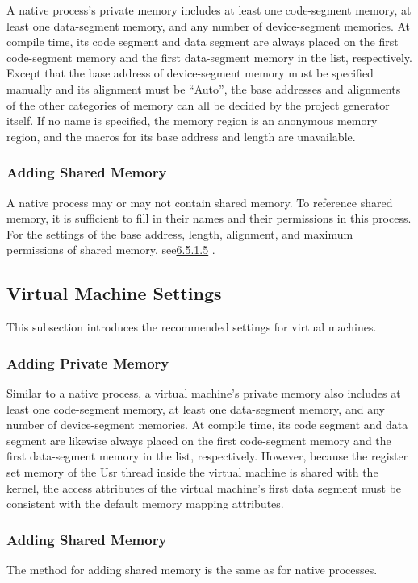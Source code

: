 A native process's private memory includes at least one code-segment memory, at least one data-segment memory, and any number of device-segment memories. At compile time, its code segment and data segment are always placed on the first code-segment memory and the first data-segment memory in the list, respectively. Except that the base address of device-segment memory must be specified manually and its alignment must be ``Auto'', the base addresses and alignments of the other categories of memory can all be decided by the project generator itself. If no name is specified, the memory region is an anonymous memory region, and the macros for its base address and length are unavailable.

\subsubsection{Adding Shared Memory}\label{subsubsec:6-5-4-2}

A native process may or may not contain shared memory. To reference shared memory, it is sufficient to fill in their names and their permissions in this process. For the settings of the base address, length, alignment, and maximum permissions of shared memory, see\protect\hyperref[subsubsec:6-5-1-5]{6.5.1.5}
.

\subsection{Virtual Machine Settings}\label{subsec:6-5-5}

This subsection introduces the recommended settings for virtual machines.

\subsubsection{Adding Private Memory}\label{subsubsec:6-5-5-1}

Similar to a native process, a virtual machine's private memory also includes at least one code-segment memory, at least one data-segment memory, and any number of device-segment memories. At compile time, its code segment and data segment are likewise always placed on the first code-segment memory and the first data-segment memory in the list, respectively. However, because the register set memory of the Usr thread inside the virtual machine is shared with the kernel, the access attributes of the virtual machine's first data segment must be consistent with the default memory mapping attributes.

\subsubsection{Adding Shared Memory}\label{subsubsec:6-5-5-2}

The method for adding shared memory is the same as for native processes.
